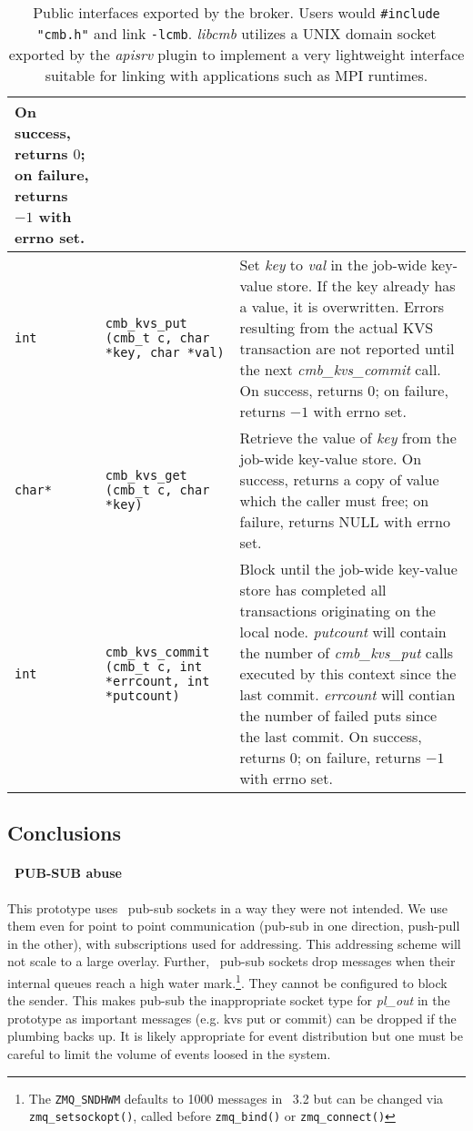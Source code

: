 \begin{table}
\begin{tabular}{|p{0.7cm}p{5cm}|p{9cm}|}
    On success, returns $0$; on failure, returns $-1$ with errno set.\\
\hline
{\tt int}
  & {\tt cmb\_kvs\_put (cmb\_t c, char {*key}, char {*val})}
  & Set {\em key} to {\em val} in the job-wide key-value store.
    If the key already has a value, it is overwritten.
    Errors resulting from the actual KVS transaction are not reported
    until the next {\em cmb\_kvs\_commit} call.
    On success, returns $0$; on failure, returns $-1$ with errno set.\\
{\tt {char*}}
  & {\tt cmb\_kvs\_get (cmb\_t c, char {*key})}
  & Retrieve the value of {\em key} from the job-wide key-value store.
    On success, returns a copy of value which the caller must free;
    on failure, returns NULL with errno set.\\
{\tt int}
  & {\tt cmb\_kvs\_commit (cmb\_t c, int *errcount, int *putcount)}
  & Block until the job-wide key-value store has completed all transactions
    originating on the local node.  {\em putcount} will contain the number
    of {\em cmb\_kvs\_put} calls executed by this context since the last commit.
    {\em errcount} will contian the number of failed puts since the last commit.
    On success, returns $0$; on failure, returns $-1$ with errno set.\\
\hline
\end{tabular}
\caption{Public interfaces exported by the broker.  Users would
{\tt \#include "cmb.h"} and link {\tt -lcmb}.  {\em libcmb} utilizes
a UNIX domain socket exported by the {\em apisrv} plugin to implement
a very lightweight interface suitable for linking with applications such
as MPI runtimes.}
\label{tab:cmbapi}
\end{table}

\subsection{Conclusions}

\paragraph{\zMQ\ PUB-SUB abuse} This prototype uses \zMQ\ pub-sub sockets
in a way they were not intended.   We use them even for point to point
communication (pub-sub in one direction, push-pull in the other),
with subscriptions used for addressing.  This addressing scheme will not
scale to a large overlay.  Further, \zMQ\ pub-sub sockets drop messages when
their internal queues reach a high water mark.\footnote{The {\tt ZMQ\_SNDHWM}
defaults to 1000 messages in \zMQ\ 3.2 but can be changed via
{\tt zmq\_setsockopt()}, called before {\tt zmq\_bind()} or
{\tt zmq\_connect()}}.
They cannot be configured to block the sender.  This makes pub-sub
the inappropriate socket type for {\em pl\_out} in the prototype as
important messages (e.g. kvs put or commit) can be dropped if the
plumbing backs up.
It is likely appropriate for event distribution but one must be careful
to limit the volume of events loosed in the system.


